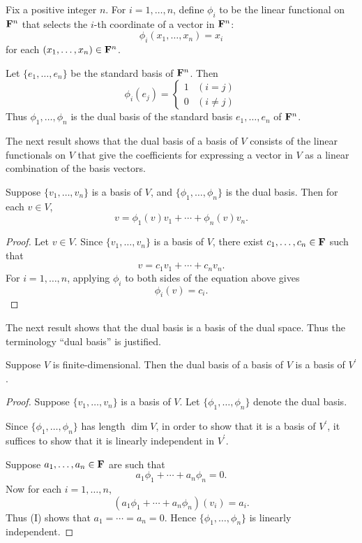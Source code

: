 \begin{example}
Fix a positive integer $n$. For $i=1,\dots,n$, define $\phi_i$ to be the linear functional on $\mathbf F^n$ that selects the $i$-th coordinate of a vector in $\mathbf F^n$:
\[\phi_i(x_1,\dots,x_n)=x_i\]
for each $(x_1,\dots,x_n)\in\mathbf F^n$.

Let $\{e_1,\dots,e_n\}$ be the standard basis of $\mathbf F^n$. Then
\[\phi_i(e_j)=\begin{cases}
1&(i=j)\\
0&(i\neq j)
\end{cases}\]
Thus $\phi_1,\dots,\phi_n$ is the dual basis of the standard basis $e_1,\dots,e_n$ of $\mathbf F^n$.
\end{example}

The next result shows that the dual basis of a basis of $V$ consists of the linear functionals on $V$ that give the coefficients for expressing a vector in $V$ as a linear combination of the basis vectors.

\begin{proposition}
Suppose $\{v_1,\dots,v_n\}$ is a basis of $V$, and $\{\phi_1,\dots,\phi_n\}$ is the dual basis. Then for each $v\in V$,
\[v=\phi_1(v)v_1+\cdots+\phi_n(v)v_n.\]
\end{proposition}

\begin{proof}
Let $v\in V$. Since $\{v_1,\dots,v_n\}$ is a basis of $V$, there exist $c_1,\dots,c_n\in\mathbf F$ such that
\[v=c_1v_1+\cdots+c_nv_n.\]
For $i=1,\dots,n$, applying $\phi_i$ to both sides of the equation above gives
\[\phi_i(v)=c_i.\]
\end{proof}

The next result shows that the dual basis is a basis of the dual space. Thus the terminology ``dual basis'' is justified.

\begin{lemma}
Suppose $V$ is finite-dimensional. Then the dual basis of a basis of $V$ is a basis of $V^\prime$.
\end{lemma}

\begin{proof}
Suppose $\{v_1,\dots,v_n\}$ is a basis of $V$. Let $\{\phi_1,\dots,\phi_n\}$ denote the dual basis. 

Since $\{\phi_1,\dots,\phi_n\}$ has length $\dim V$, in order to show that it is a basis of $V^\prime$, it suffices to show that it is linearly independent in $V^\prime$.

Suppose $a_1,\dots,a_n\in\mathbf F$ are such that
\begin{equation*}\tag{I}
a_1\phi_1+\cdots+a_n\phi_n=0.
\end{equation*}
Now for each $i=1,\dots,n$,
\[(a_1\phi_1+\cdots+a_n\phi_n)(v_i)=a_i.\]
Thus (I) shows that $a_1=\cdots=a_n=0$. Hence $\{\phi_1,\dots,\phi_n\}$ is linearly independent.
\end{proof}

